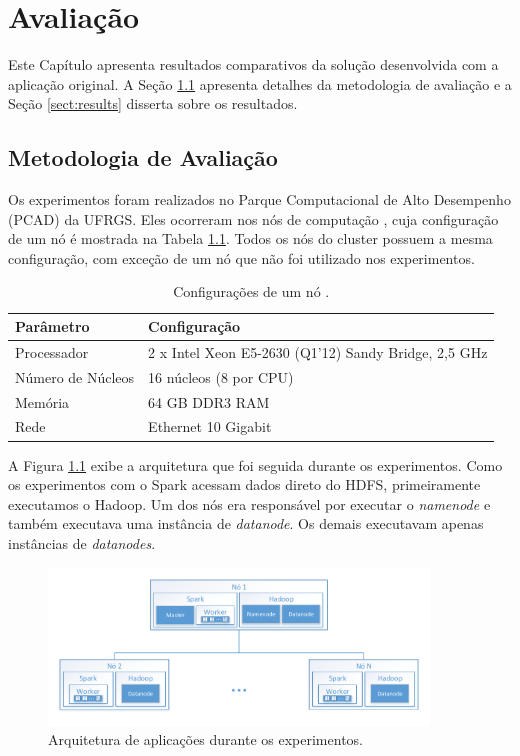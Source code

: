 \chapter{Avaliação} \label{ch:evaluation}

Este Capítulo apresenta resultados comparativos da solução desenvolvida com a 
aplicação original. A Seção \ref{sect:methodology} apresenta detalhes da 
metodologia de avaliação e a Seção \ref{sect:results} disserta sobre os 
resultados.


\section{Metodologia de Avaliação} \label{sect:methodology}

Os experimentos foram realizados no Parque Computacional de Alto Desempenho 
(PCAD) da UFRGS. Eles ocorreram nos nós de computação , cuja 
configuração de um nó é mostrada na Tabela \ref{tab:draco_config}. Todos os nós 
do cluster possuem a mesma configuração, com exceção de um nó que não foi 
utilizado nos experimentos.

\begin{table}[H]
\centering
\small
\begin{tabular}{l l} \toprule
\textbf{Parâmetro}  &  \textbf{Configuração} \\ 
\midrule
Processador     & 2 x Intel Xeon E5-2630 (Q1'12) Sandy Bridge, 2,5 GHz  
\\
Número de Núcleos    & 16 núcleos (8 por CPU)  \\
Memória       & 64 GB DDR3 RAM   \\
Rede	      & Ethernet 10 Gigabit \\
\end{tabular}
\caption{Configurações de um nó .}
\label{tab:draco_config}
\end{table}


A Figura \ref{fig:experiment_arch} exibe a arquitetura que foi seguida durante 
os experimentos. Como os experimentos com o Spark acessam dados direto do HDFS, 
primeiramente executamos o Hadoop. Um dos nós era responsável por executar o 
\emph{namenode} e também executava uma instância de \emph{datanode}. Os demais 
executavam apenas instâncias de \emph{datanodes}.


\begin{figure}[ht]
\centerline{
\includegraphics[width=0.9\textwidth]{./img/experiments_arch.pdf}}
 \caption{Arquitetura de aplicações durante os experimentos.}
 \label{fig:experiment_arch}
\end{figure}


